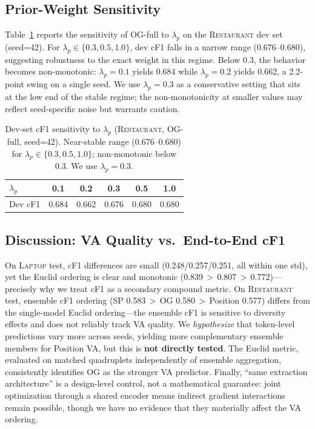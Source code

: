 \documentclass[runningheads]{llncs}
\newcommand{\restaurant}{{\normalfont\textsc{Restaurant}}}
\newcommand{\laptop}{{\normalfont\textsc{Laptop}}}
\begin{document}
\subsection{Prior-Weight Sensitivity}
\label{sec:lambda}

Table~\ref{tab:lambda} reports the sensitivity of OG-full to $\lambda_p$ on the \restaurant{} dev set (seed=42). For $\lambda_p \in \{0.3, 0.5, 1.0\}$, dev cF1 falls in a narrow range (0.676--0.680), suggesting robustness to the exact weight in this regime. Below 0.3, the behavior becomes non-monotonic: $\lambda_p\!=\!0.1$ yields 0.684 while $\lambda_p\!=\!0.2$ yields 0.662, a 2.2-point swing on a single seed. We use $\lambda_p\!=\!0.3$ as a conservative setting that sits at the low end of the stable regime; the non-monotonicity at smaller values may reflect seed-specific noise but warrants caution.

\begin{table}[h]
\centering\small
\caption{Dev-set cF1 sensitivity to $\lambda_p$ (\restaurant{}, OG-full, seed=42). Near-stable range (0.676--0.680) for $\lambda_p \in \{0.3,0.5,1.0\}$; non-monotonic below 0.3. We use $\lambda_p\!=\!0.3$.}
\label{tab:lambda}
\setlength{\tabcolsep}{8pt}
\begin{tabular}{@{}lccccc@{}}
\toprule
$\lambda_p$ & 0.1 & 0.2 & 0.3 & 0.5 & 1.0 \\
\midrule
Dev cF1 & 0.684 & 0.662 & 0.676 & 0.680 & 0.680 \\
\bottomrule
\end{tabular}
\end{table}

\subsection{Discussion: VA Quality vs.\ End-to-End cF1}
\label{sec:discussion}

On \laptop{} test, cF1 differences are small (0.248/0.257/0.251, all within one std), yet the Euclid ordering is clear and monotonic (0.839\,$>\,$0.807\,$>\,$0.772)---precisely why we treat cF1 as a secondary compound metric. On \restaurant{} test, ensemble cF1 ordering (SP 0.583\,$>$\,OG 0.580\,$>$\,Position 0.577) differs from the single-model Euclid ordering---the ensemble cF1 is sensitive to diversity effects and does not reliably track VA quality. We \emph{hypothesize} that token-level predictions vary more across seeds, yielding more complementary ensemble members for Position VA, but this is \textbf{not directly tested}. The Euclid metric, evaluated on matched quadruplets independently of ensemble aggregation, consistently identifies OG as the stronger VA predictor. Finally, ``same extraction architecture'' is a design-level control, not a mathematical guarantee: joint optimization through a shared encoder means indirect gradient interactions remain possible, though we have no evidence that they materially affect the VA ordering.
\end{document}
